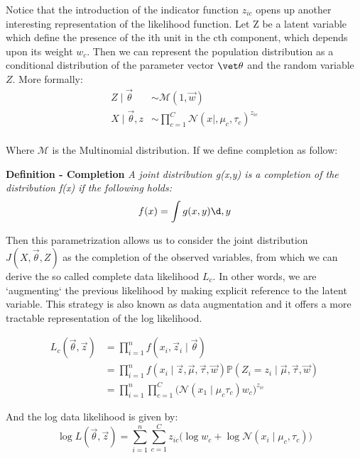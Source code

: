 \documentclass{article}
\begin{document}
Notice that the introduction of the indicator function $z_{ic}$ opens up another interesting representation of the likelihood function. Let Z be a latent variable which define the presence of the ith unit in the cth component, which depends upon its weight $w_c$. Then we can represent the population distribution as a conditional distribution of the parameter vector $\vet \theta$ and the random variable $Z$. More formally:
\begin{align*}
Z \mid \vec \theta & \sim \mathcal{M}(1, \vec w) \\
X \mid \vec \theta, z & \sim \prod_{c=1}^C \mathcal{N}(x \mid, \mu_c, \tau_c)^{z_{ic}}\\
\end{align*}

Where $\mathcal{M}$ is the Multinomial distribution. If we define completion as follow:

\textbf{Definition - Completion} \textit{
A joint distribution g(x,y) is a completion of the distribution f(x) if the following holds:}
\begin{equation}
f(x) = \int g(x,y) \d,y
\end{equation}

Then this parametrization allows us to consider the joint distribution $J(X, \vec \theta, Z)$ as the completion of the observed variables, from which we can derive the so called complete data likelihood $L_c$. In other words, we are `augmenting` the previous likelihood by making explicit reference to the latent variable. This strategy is also known as data augmentation and it offers a more tractable representation of the log likelihood.

\begin{equation}
\begin{split}
L_c(\vec \theta, \vec z) &= \prod_{i=1}^n f(x_i, \vec z_i \mid \vec \theta) \\
&= \prod_{i=1}^n f(x_i \mid  \vec z, \vec \mu, \vec \tau, \vec w) \mathbb{P}(Z_i = z_i \mid \vec \mu, \vec \tau, \vec w) \\
&= \prod_{i=1}^n \prod_{c=1}^C \bigg( \mathcal{N}(x_1 \mid \mu_c \tau_c) w_c \bigg)^{z_{ic}}
\end{split}
\end{equation}

And the log data likelihood is given by:
\begin{equation}
\log L(\vec \theta, \vec z) = \sum_{i=1}^n \sum_{c=1}^C z_{ic}\bigg (\log w_c + \log \mathcal{N}(x_i \mid \mu_c, \tau_c) \bigg)
\end{equation}
\end{document}
